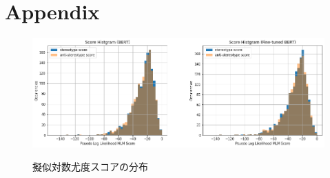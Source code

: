 \documentclass[
  platex, dvipdfmx %
]{nlp2021}
\begin{document}
\clearpage






\clearpage
\appendix
\onecolumn
\section{Appendix}

\begin{figure}[h]
\centering
\caption{擬似対数尤度スコアの分布}
\includegraphics[width=15cm]{hist_pseudo_log_likelihood.png}
\label{fig:hist_log_likelihoods}
\end{figure}
\end{document}
